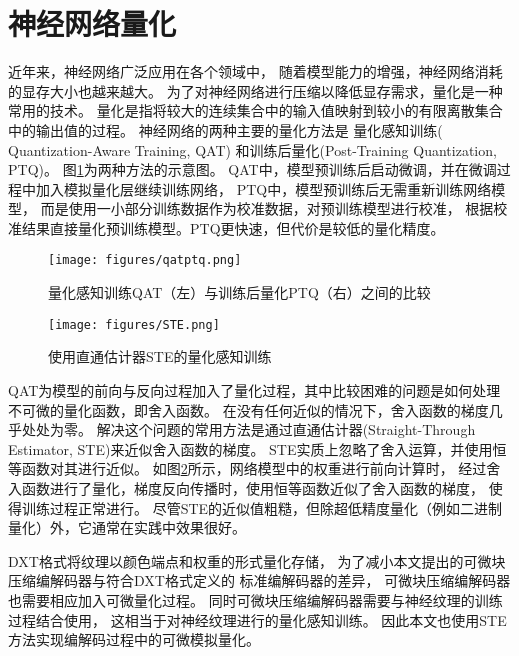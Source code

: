 \section{神经网络量化}

近年来，神经网络广泛应用在各个领域中，
随着模型能力的增强，神经网络消耗的显存大小也越来越大。
为了对神经网络进行压缩以降低显存需求，量化是一种常用的技术。
量化是指将较大的连续集合中的输入值映射到较小的有限离散集合中的输出值的过程\cite{gholami2022survey}。
神经网络的两种主要的量化方法是
量化感知训练( Quantization-Aware Training, QAT)
和训练后量化(Post-Training Quantization, PTQ)。
图\ref{fig:qatptq}为两种方法的示意图。
QAT中，模型预训练后启动微调，并在微调过程中加入模拟量化层继续训练网络，
PTQ中，模型预训练后无需重新训练网络模型，
而是使用一小部分训练数据作为校准数据，对预训练模型进行校准，
根据校准结果直接量化预训练模型。PTQ更快速，但代价是较低的量化精度。
\begin{figure}[htbp]
    \centering
    \texttt{[image: figures/qatptq.png]}
    \caption{量化感知训练QAT（左）与训练后量化PTQ（右）之间的比较\cite{gholami2022survey}}
    \label{fig:qatptq}
\end{figure}

\begin{figure}[htbp]
    \centering
    \texttt{[image: figures/STE.png]}
    \caption{使用直通估计器STE的量化感知训练\cite{gholami2022survey}}
    \label{fig:STE}
\end{figure}

QAT为模型的前向与反向过程加入了量化过程，其中比较困难的问题是如何处理不可微的量化函数，即舍入函数。
在没有任何近似的情况下，舍入函数的梯度几乎处处为零。
解决这个问题的常用方法是通过直通估计器(Straight-Through Estimator, STE)来近似舍入函数的梯度。 
STE实质上忽略了舍入运算，并使用恒等函数对其进行近似。
如图\ref{fig:STE}所示，网络模型中的权重进行前向计算时，
经过舍入函数进行了量化，梯度反向传播时，使用恒等函数近似了舍入函数的梯度，
使得训练过程正常进行。
尽管STE的近似值粗糙，但除超低精度量化（例如二进制量化）外，它通常在实践中效果很好\cite{gholami2022survey}。

DXT格式将纹理以颜色端点和权重的形式量化存储，
为了减小本文提出的可微块压缩编解码器与符合DXT格式定义的
标准编解码器的差异，
可微块压缩编解码器也需要相应加入可微量化过程。
同时可微块压缩编解码器需要与神经纹理的训练过程结合使用，
这相当于对神经纹理进行的量化感知训练。
因此本文也使用STE方法实现编解码过程中的可微模拟量化。


